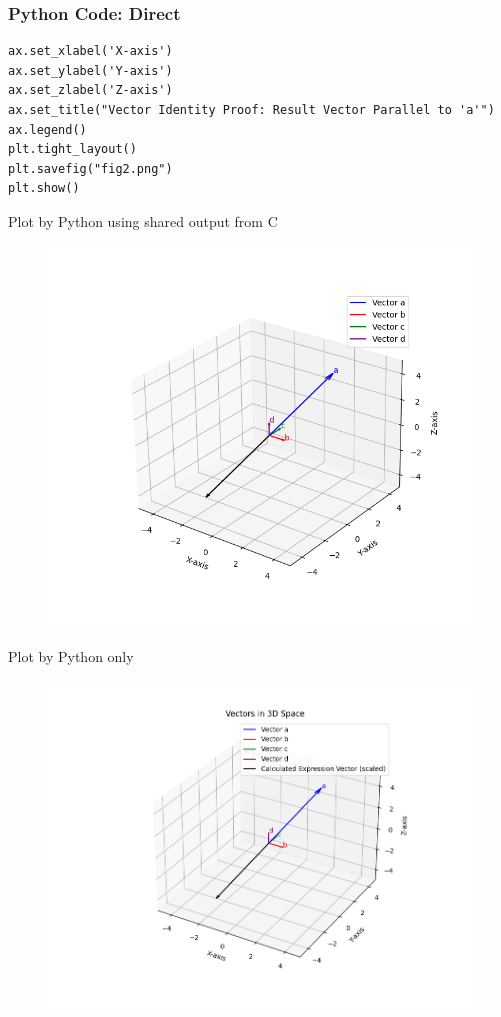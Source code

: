 \documentclass{beamer}
\begin{document}
\begin{frame}[fragile]
\frametitle{Python Code: Direct}
\begin{lstlisting}
ax.set_xlabel('X-axis')
ax.set_ylabel('Y-axis')
ax.set_zlabel('Z-axis')
ax.set_title("Vector Identity Proof: Result Vector Parallel to 'a'")
ax.legend()
plt.tight_layout()
plt.savefig("fig2.png")
plt.show()
\end{lstlisting}
\end{frame}

\begin{frame}{Plot by Python using shared output from C}
\begin{figure}[H]
\centering
\includegraphics[width=0.8\columnwidth]{../figs/fig1.png}
\caption{}
\label{fig:1}
\end{figure}
\end{frame}

\begin{frame}{Plot by Python only}
\begin{figure}[H]
\centering
\includegraphics[width=0.8\columnwidth]{../figs/fig2.png}
\caption{}
\label{fig:2}
\end{figure}
\end{frame}
\end{document}
